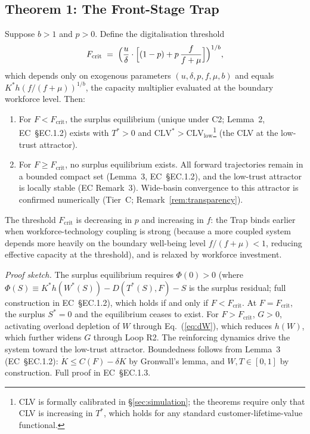 \documentclass[msom,dblanonrev]{informs4}
\begin{document}
\subsection{Theorem 1: The Front-Stage Trap}\label{sec:analysis:trap}

\begin{theorem}\label{thm:trap}
Suppose $b > 1$ and $p > 0$. Define the digitalisation threshold
\begin{equation}\label{eq:Fcrit}
    F_{\mathrm{crit}} \;=\; \Bigl(\frac{u}{\delta}\cdot\Bigl[(1-p)+p\,\frac{f}{f+\mu}\Bigr]\Bigr)^{1/b},
\end{equation}
which depends only on exogenous parameters $(u,\delta,p,f,\mu,b)$ and equals $K^*h(f/(f+\mu))^{1/b}$, the capacity multiplier evaluated at the boundary workforce level. Then:
\begin{enumerate}
    \item[(i)] For $F < F_{\mathrm{crit}}$, the surplus equilibrium (unique under C2; Lemma~2, EC~\S EC.1.2) exists with $T^* > 0$ and $\mathrm{CLV}^* > \mathrm{CLV}_{\mathrm{low}}$\footnote{CLV is formally calibrated in \S\ref{sec:simulation}; the theorems require only that CLV is increasing in $T^*$, which holds for any standard customer-lifetime-value functional.} (the CLV at the low-trust attractor).
    \item[(ii)] For $F \geq F_{\mathrm{crit}}$, no surplus equilibrium exists. All forward trajectories remain in a bounded compact set (Lemma~3, EC~\S EC.1.2), and the low-trust attractor is locally stable (EC Remark~3). Wide-basin convergence to this attractor is confirmed numerically (Tier~C; Remark~\ref{rem:transparency}).
\end{enumerate}
The threshold $F_{\mathrm{crit}}$ is decreasing in $p$ and increasing in $f$: the Trap binds earlier when workforce-technology coupling is strong (because a more coupled system depends more heavily on the boundary well-being level $f/(f{+}\mu) < 1$, reducing effective capacity at the threshold), and is relaxed by workforce investment.
\end{theorem}

\noindent\textit{Proof sketch.}
The surplus equilibrium requires $\Phi(0) > 0$ (where $\Phi(S) \equiv K^*h(W^*(S)) - D(T^*(S),F) - S$ is the surplus residual; full construction in EC~\S EC.1.2), which holds if and only if $F < F_{\mathrm{crit}}$. At $F = F_{\mathrm{crit}}$, the surplus $S^* = 0$ and the equilibrium ceases to exist. For $F > F_{\mathrm{crit}}$, $G > 0$, activating overload depletion of $W$ through Eq.~(\ref{eq:dW}), which reduces $h(W)$, which further widens $G$ through Loop R2. The reinforcing dynamics drive the system toward the low-trust attractor. Boundedness follows from Lemma~3 (EC~\S EC.1.2): $\dot{K} \leq C(F) - \delta K$ by Gronwall's lemma, and $W,T\in[0,1]$ by construction. Full proof in EC~\S EC.1.3. \Halmos
\end{document}
